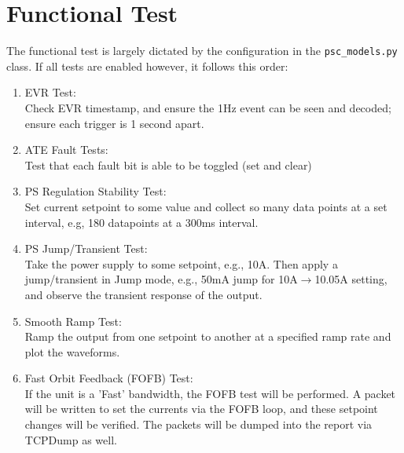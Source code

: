 \section{Functional Test}
The functional test is largely dictated by the configuration in the \texttt{psc\_models.py} class. If all tests are enabled however, it follows this order:\\
\begin{enumerate}
	\item EVR Test:\\
	Check EVR timestamp, and ensure the 1Hz event can be seen and decoded; ensure each trigger is 1 second apart. 

	\item ATE Fault Tests:\\
	Test that each fault bit is able to be toggled (set and clear)
	
	\item PS Regulation Stability Test:\\
	Set current setpoint to some value and collect so many data points at a set interval, e.g, 180 datapoints at a 300ms interval.
	
	\item PS Jump/Transient Test:\\
	Take the power supply to some setpoint, e.g., 10A. Then apply a jump/transient in Jump mode, e.g., 50mA jump for 10A$\rightarrow$10.05A setting, and observe the transient response of the output.
	
	\item Smooth Ramp Test:\\
	Ramp the output from one setpoint to another at a specified ramp rate and plot the waveforms. 
	
	\item Fast Orbit Feedback (FOFB) Test:\\
	If the unit is a 'Fast' bandwidth, the FOFB test will be performed. A packet will be written to set the currents via the FOFB loop, and these setpoint changes will be verified. The packets will be dumped into the report via TCPDump as well. 

\end{enumerate}
